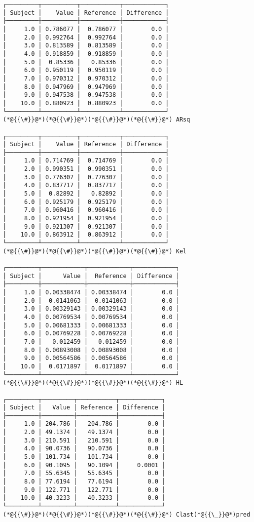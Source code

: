 \documentclass[12pt,a4paper]{article}
\begin{document}
\begin{lstlisting}
┌─────────┬──────────┬───────────┬────────────┐
│ Subject │    Value │ Reference │ Difference │
├─────────┼──────────┼───────────┼────────────┤
│     1.0 │ 0.786077 │  0.786077 │        0.0 │
│     2.0 │ 0.992764 │  0.992764 │        0.0 │
│     3.0 │ 0.813589 │  0.813589 │        0.0 │
│     4.0 │ 0.918859 │  0.918859 │        0.0 │
│     5.0 │  0.85336 │   0.85336 │        0.0 │
│     6.0 │ 0.950119 │  0.950119 │        0.0 │
│     7.0 │ 0.970312 │  0.970312 │        0.0 │
│     8.0 │ 0.947969 │  0.947969 │        0.0 │
│     9.0 │ 0.947538 │  0.947538 │        0.0 │
│    10.0 │ 0.880923 │  0.880923 │        0.0 │
└─────────┴──────────┴───────────┴────────────┘
(*@{{\#}}@*)(*@{{\#}}@*)(*@{{\#}}@*)(*@{{\#}}@*) ARsq

┌─────────┬──────────┬───────────┬────────────┐
│ Subject │    Value │ Reference │ Difference │
├─────────┼──────────┼───────────┼────────────┤
│     1.0 │ 0.714769 │  0.714769 │        0.0 │
│     2.0 │ 0.990351 │  0.990351 │        0.0 │
│     3.0 │ 0.776307 │  0.776307 │        0.0 │
│     4.0 │ 0.837717 │  0.837717 │        0.0 │
│     5.0 │  0.82892 │   0.82892 │        0.0 │
│     6.0 │ 0.925179 │  0.925179 │        0.0 │
│     7.0 │ 0.960416 │  0.960416 │        0.0 │
│     8.0 │ 0.921954 │  0.921954 │        0.0 │
│     9.0 │ 0.921307 │  0.921307 │        0.0 │
│    10.0 │ 0.863912 │  0.863912 │        0.0 │
└─────────┴──────────┴───────────┴────────────┘
(*@{{\#}}@*)(*@{{\#}}@*)(*@{{\#}}@*)(*@{{\#}}@*) Kel

┌─────────┬────────────┬────────────┬────────────┐
│ Subject │      Value │  Reference │ Difference │
├─────────┼────────────┼────────────┼────────────┤
│     1.0 │ 0.00338474 │ 0.00338474 │        0.0 │
│     2.0 │  0.0141063 │  0.0141063 │        0.0 │
│     3.0 │ 0.00329143 │ 0.00329143 │        0.0 │
│     4.0 │ 0.00769534 │ 0.00769534 │        0.0 │
│     5.0 │ 0.00681333 │ 0.00681333 │        0.0 │
│     6.0 │ 0.00769228 │ 0.00769228 │        0.0 │
│     7.0 │   0.012459 │   0.012459 │        0.0 │
│     8.0 │ 0.00893008 │ 0.00893008 │        0.0 │
│     9.0 │ 0.00564586 │ 0.00564586 │        0.0 │
│    10.0 │  0.0171897 │  0.0171897 │        0.0 │
└─────────┴────────────┴────────────┴────────────┘
(*@{{\#}}@*)(*@{{\#}}@*)(*@{{\#}}@*)(*@{{\#}}@*) HL

┌─────────┬─────────┬───────────┬────────────┐
│ Subject │   Value │ Reference │ Difference │
├─────────┼─────────┼───────────┼────────────┤
│     1.0 │ 204.786 │   204.786 │        0.0 │
│     2.0 │ 49.1374 │   49.1374 │        0.0 │
│     3.0 │ 210.591 │   210.591 │        0.0 │
│     4.0 │ 90.0736 │   90.0736 │        0.0 │
│     5.0 │ 101.734 │   101.734 │        0.0 │
│     6.0 │ 90.1095 │   90.1094 │     0.0001 │
│     7.0 │ 55.6345 │   55.6345 │        0.0 │
│     8.0 │ 77.6194 │   77.6194 │        0.0 │
│     9.0 │ 122.771 │   122.771 │        0.0 │
│    10.0 │ 40.3233 │   40.3233 │        0.0 │
└─────────┴─────────┴───────────┴────────────┘
(*@{{\#}}@*)(*@{{\#}}@*)(*@{{\#}}@*)(*@{{\#}}@*) Clast(*@{{\_}}@*)pred


\end{lstlisting}
\end{document}

